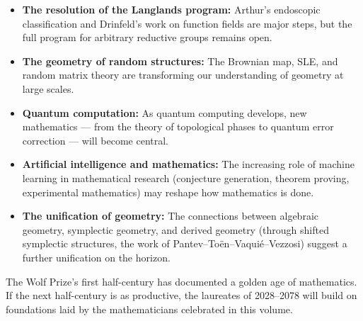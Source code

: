 \begin{itemize}
    \item \textbf{The resolution of the Langlands program:} Arthur's endoscopic classification and Drinfeld's work on function fields are major steps, but the full program for arbitrary reductive groups remains open.
    \item \textbf{The geometry of random structures:} The Brownian map, SLE, and random matrix theory are transforming our understanding of geometry at large scales.
    \item \textbf{Quantum computation:} As quantum computing develops, new mathematics --- from the theory of topological phases to quantum error correction --- will become central.
    \item \textbf{Artificial intelligence and mathematics:} The increasing role of machine learning in mathematical research (conjecture generation, theorem proving, experimental mathematics) may reshape how mathematics is done.
    \item \textbf{The unification of geometry:} The connections between algebraic geometry, symplectic geometry, and derived geometry (through shifted symplectic structures, the work of Pantev--To\"en--Vaqui\'e--Vezzosi) suggest a further unification on the horizon.
\end{itemize}

The Wolf Prize's first half-century has documented a golden age of mathematics. If the next half-century is as productive, the laureates of 2028--2078 will build on foundations laid by the mathematicians celebrated in this volume.
